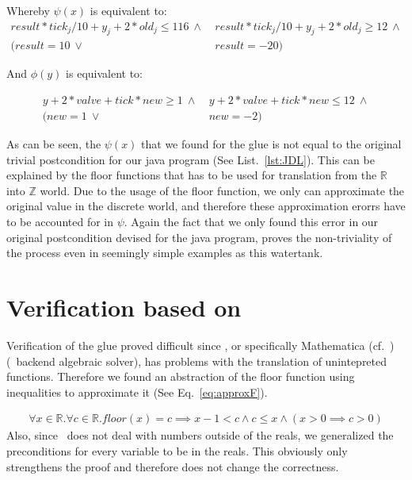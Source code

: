 Whereby \(\psi(x)\) is equivalent to:
\begin{equation}
	\begin{split}
		result * tick_j/10 + y_j + 2 * old_j \leq 116~\wedge&~result * tick_j/10 + y_j + 2 * old_j \geq 12~\wedge \\ (result = 10~\vee&~result = -20)
	\end{split}
	\label{eq:psiWatertank}
\end{equation}

And \(\phi(y)\) is equivalent to:

\begin{equation}
	\begin{split}
		 y + 2 * valve + tick * new \geq 1~\wedge&~y + 2 * valve + tick * new \leq 12~\wedge \\ (new = 1~\vee&~new = -2)
	\end{split}
	\label{eq:phiWatertank}
\end{equation}

As can be seen, the \(\psi(x)\) that we found for the glue is not equal to the original trivial postcondition for our java program (See List.~\ref{lst:JDL}). This can be explained by the floor functions that has to be used for translation from the \(\mathbb{R}\) into \(\mathbb{Z}\) world. Due to the usage of the floor function, we only can approximate the original value in the discrete world, and therefore these approximation erorrs have to be accounted for in \(\psi\). Again the fact that we only found this error in our original postcondition devised for the java program, proves the non-triviality of the process even in seemingly simple examples as this watertank.

\section{Verification based on \keym}
\label{sec:Watertank:Verification}

Verification of the glue proved difficult since \keym, or specifically Mathematica (cf.~\cite{mathematica}) (\keym~backend algebraic solver), has problems with the translation of unintepreted functions. Therefore we found an abstraction of the floor function using inequalities to approximate it (See Eq.~\ref{eq:approxF}). 

\begin{align*}
		\forall x \in \mathbb{R}. \forall c \in \mathbb{R}. floor(x) = c \implies x-1 < c \wedge c \leq x \wedge( x>0\implies c>0)
	\label{eq:approxF}
\end{align*}
Also, since \keym~does not deal with numbers outside of the reals, we generalized the preconditions for every variable to be in the reals. This obviously only strengthens the proof and therefore does not change the correctness.

